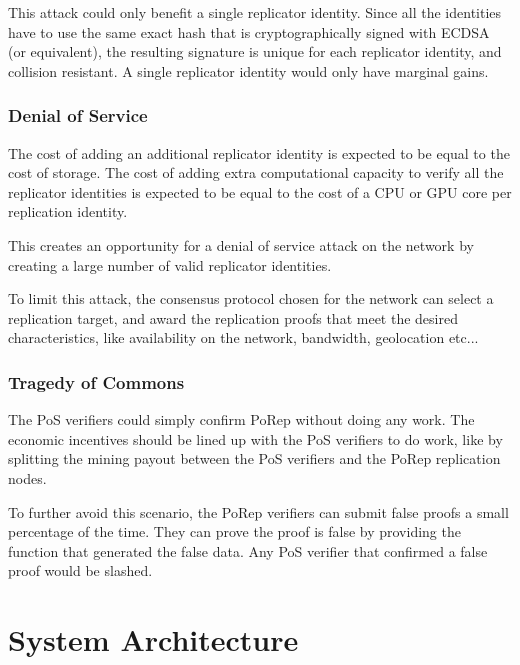 \documentclass[12pt]{article}
\begin{document}
This attack could only benefit a single replicator identity. Since all the identities have to use the same exact hash that is cryptographically signed with ECDSA (or equivalent), the resulting signature is unique for each replicator identity, and collision resistant. A single replicator identity would only have marginal gains.
\subsubsection{Denial of Service}
The cost of adding an additional replicator identity is expected to be equal to the cost of storage. The cost of adding extra computational capacity to verify all the replicator identities is expected to be equal to the cost of a CPU or GPU core per replication identity.

This creates an opportunity for a denial of service attack on the network by creating a large number of valid replicator identities.

To limit this attack, the consensus protocol chosen for the network can select a replication target, and award the replication proofs that meet the desired characteristics, like availability on the network, bandwidth, geolocation etc...
\subsubsection{Tragedy of Commons}

The PoS verifiers could simply confirm PoRep without doing any work. The economic incentives should be lined up with the PoS verifiers to do work, like by splitting the mining payout between the PoS verifiers and the PoRep replication nodes.

To further avoid this scenario, the PoRep verifiers can submit false proofs a small percentage of the time. They can prove the proof is false by providing the function that generated the false data. Any PoS verifier that confirmed a false proof would be slashed.

\section{System Architecture}\label{system_architecture}
\end{document}
